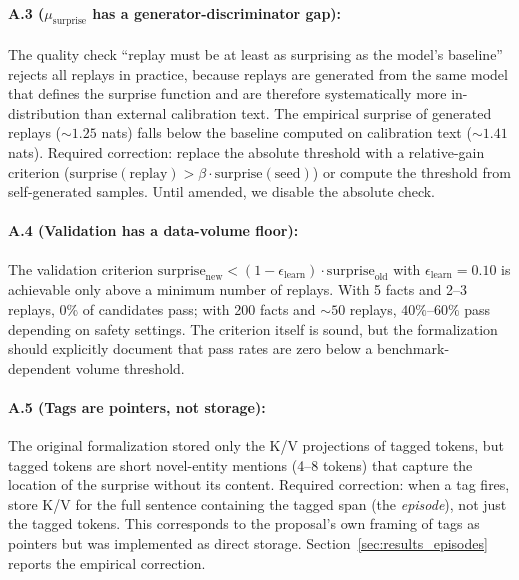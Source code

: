 \paragraph{A.3 ($\mu_{\mathrm{surprise}}$ has a generator-discriminator gap):} The quality check ``replay must be at least as surprising as the model's baseline'' rejects all replays in practice, because replays are generated from the same model that defines the surprise function and are therefore systematically more in-distribution than external calibration text. The empirical surprise of generated replays ($\sim 1.25$ nats) falls below the baseline computed on calibration text ($\sim 1.41$ nats). Required correction: replace the absolute threshold with a relative-gain criterion ($\mathrm{surprise(\mathrm{replay})} > \beta \cdot \mathrm{surprise(\mathrm{seed})}$) or compute the threshold from self-generated samples. Until amended, we disable the absolute check.

\paragraph{A.4 (Validation has a data-volume floor):} The validation criterion $\mathrm{surprise}_\mathrm{new} < (1 - \epsilon_\mathrm{learn}) \cdot \mathrm{surprise}_\mathrm{old}$ with $\epsilon_\mathrm{learn} = 0.10$ is achievable only above a minimum number of replays. With 5 facts and 2--3 replays, $0\%$ of candidates pass; with 200 facts and $\sim 50$ replays, $40\%$--$60\%$ pass depending on safety settings. The criterion itself is sound, but the formalization should explicitly document that pass rates are zero below a benchmark-dependent volume threshold.

\paragraph{A.5 (Tags are pointers, not storage):} The original formalization stored only the K/V projections of tagged tokens, but tagged tokens are short novel-entity mentions (4--8 tokens) that capture the location of the surprise without its content. Required correction: when a tag fires, store K/V for the full sentence containing the tagged span (the \emph{episode}), not just the tagged tokens. This corresponds to the proposal's own framing of tags as pointers but was implemented as direct storage. Section~\ref{sec:results_episodes} reports the empirical correction.

